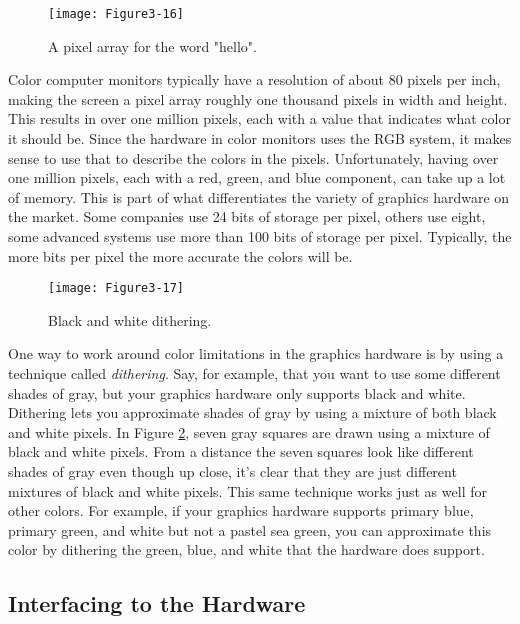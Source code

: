 \begin{figure}[!htb]
  \centering
  \texttt{[image: Figure3-16]}\\
  \caption{A pixel array for the word "hello".}\label{fig:Figure3-16}
\end{figure}

Color computer monitors typically have a resolution of about 80 pixels per inch, making the screen a pixel array roughly one thousand pixels in width and height. This results in over one million pixels, each with a value that indicates what color it should be. Since the hardware in color monitors uses the RGB system, it makes sense to use that to describe the colors in the pixels. Unfortunately, having over one million pixels, each with a red, green, and blue component, can take up a lot of memory. This is part of what differentiates the variety of graphics hardware on the market. Some companies use 24 bits of storage per pixel, others use eight, some advanced systems use more than 100 bits of storage per pixel. Typically, the more bits per pixel the more accurate the colors will be.

\begin{figure}[!htb]
  \centering
  \texttt{[image: Figure3-17]}\\
  \caption{Black and white dithering.}\label{fig:Figure3-17}
\end{figure}

One way to work around color limitations in the graphics hardware is by using a technique called \emph{dithering}. Say, for example, that you want to use some different shades of gray, but your graphics hardware only supports black and white. Dithering lets you approximate shades of gray by using a mixture of both black and white pixels. In Figure \ref{fig:Figure3-17}, seven gray squares are drawn using a mixture of black and white pixels. From a distance the seven squares look like different shades of gray even though up close, it's clear that they are just different mixtures of black and white pixels. This same technique works just as well for other colors. For example, if your graphics hardware supports primary blue, primary green, and white but not a pastel sea green, you can approximate this color by dithering the green, blue, and white that the hardware does support.

\subsection{Interfacing to the Hardware}

